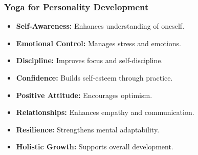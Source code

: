 \begin{frame}[fragile]\frametitle{Yoga for Personality Development}

    \begin{itemize}
        \item \textbf{Self-Awareness:} Enhances understanding of oneself.
        \item \textbf{Emotional Control:} Manages stress and emotions.
        \item \textbf{Discipline:} Improves focus and self-discipline.
        \item \textbf{Confidence:} Builds self-esteem through practice.
        \item \textbf{Positive Attitude:} Encourages optimism.
        \item \textbf{Relationships:} Enhances empathy and communication.
        \item \textbf{Resilience:} Strengthens mental adaptability.
        \item \textbf{Holistic Growth:} Supports overall development.
    \end{itemize}

\end{frame}


